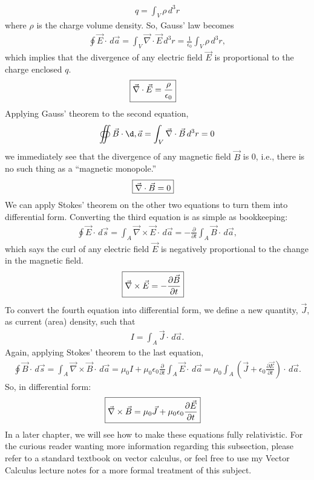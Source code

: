 \documentclass{article}
\theoremstyle{definition}
\begin{document}
\begin{align*}
q = \int_V \rho\,d^3r
\end{align*}
where $\rho$ is the charge volume density. So, Gauss' law becomes
\begin{align*}
\oint \vec{E}\cdot\,d\vec{a} = \int_V \vec{\nabla}\cdot\vec{E}\,d^3r = \frac{1}{\epsilon_0}\int_V\rho\,d^3r,
\end{align*}
which implies that the divergence of any electric field $\vec{E}$ is proportional to the charge enclosed $q$.
\begin{align*}
\Aboxed{\vec{\nabla}\cdot\vec{E} = \frac{\rho}{\epsilon_0}}
\end{align*}
Applying Gauss' theorem to the second equation,
\begin{align*}
\oiint \vec{B}\cdot\d,\vec{a} = \int_V \vec{\nabla}\cdot\vec{B}\,d^3r = 0
\end{align*}
we immediately see that the divergence of any magnetic field $\vec{B}$ is 0, i.e., there is no such thing as a ``magnetic monopole.''
\begin{align*}
\Aboxed{\vec{\nabla}\cdot\vec{B} = 0}
\end{align*}
We can apply Stokes' theorem on the other two equations to turn them into differential form. Converting the third equation is as simple as bookkeeping:
\begin{align*}
\oint \vec{E}\cdot\,d\vec{s} = \int_A\vec{\nabla}\times\vec{E}\cdot\,d\vec{a} = -\frac{\partial}{\partial t}\int_A\vec{B}\cdot\,d\vec{a},
\end{align*}
which says the curl of any electric field $\vec{E}$ is negatively proportional to the change in the magnetic field. 
\begin{align*}
\Aboxed{\vec{\nabla}\times\vec{E} = -\frac{\partial\vec{B}}{\partial t}}
\end{align*}
To convert the fourth equation into differential form, we define a new quantity, $\vec{J}$, as current (area) density, such that
\begin{align*}
I = \int_A \vec{J}\cdot\,d\vec{a}.
\end{align*} 
Again, applying Stokes' theorem to the last equation, 
\begin{align*}
\oint \vec{B}\cdot\,d\vec{s} = \int_A \vec{\nabla}\times\vec{B}\cdot\,d\vec{a} = \mu_0I+\mu_0\epsilon_0\frac{\partial}{\partial t}\int_A\vec{E}\cdot\,d\vec{a} = \mu_0\int_A\left( \vec{J} + \epsilon_0\frac{\partial \vec{E}}{\partial t}\right) \cdot\,d\vec{a}.
\end{align*}
So, in differential form:
\begin{align*}
\Aboxed{\vec{\nabla}\times\vec{B} = \mu_0\vec{J} + \mu_0\epsilon_0\frac{\partial \vec{E}}{\partial t}}
\end{align*}
In a later chapter, we will see how to make these equations fully relativistic. For the curious reader wanting more information regarding this subsection, please refer to a standard textbook on vector calculus, or feel free to use my Vector Calculus lecture notes for a more formal treatment of this subject.
\end{document}
